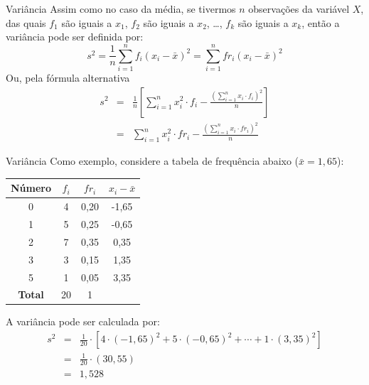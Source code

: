 \documentclass[10pt]{beamer}\usepackage[]{graphicx}\usepackage[]{color}
\theoremstyle{definition}
\begin{document}
\begin{frame}{Variância}
  Assim como no caso da média, se tivermos $n$ observações da variável
  $X$, das quais $f_1$ são iguais a $x_1$, $f_2$ são iguais a $x_2$,
  \ldots, $f_k$ são iguais a $x_k$, então a variância pode ser definida
  por:
  \begin{equation*}
    s^2 = \frac{1}{n} \sum_{i=1}^{n} f_i (x_i - \bar{x})^2 =
    \sum_{i=1}^{n} fr_i (x_i - \bar{x})^2
  \end{equation*}
  Ou, pela fórmula alternativa
  \begin{eqnarray*}
    s^2 &=& \frac{1}{n} \left[ \sum_{i=1}^{n} x_{i}^{2} \cdot f_i -
    \frac{(\sum_{i=1}^{n} x_i \cdot f_i)^2}{n} \right] \\
        &=& \sum_{i=1}^{n} x_{i}^{2} \cdot fr_i -
    \frac{(\sum_{i=1}^{n} x_i \cdot fr_i)^2}{n}
  \end{eqnarray*}
\end{frame}

\begin{frame}{Variância}
  Como exemplo, considere a tabela de frequência abaixo ($\bar{x} =
  1,65$):
  \begin{table}[h]
    \centering
    \begin{tabular}{cccc}
      \hline
      \textbf{Número} & \textbf{$f_i$} & \textbf{$fr_i$} & \textbf{$x_i - \bar{x}$} \\
      \hline
      0 & 4 & 0,20 & -1,65 \\
      1 & 5 & 0,25 & -0,65 \\
      2 & 7 & 0,35 & 0,35 \\
      3 & 3 & 0,15 & 1,35 \\
      5 & 1 & 0,05 & 3,35 \\
      \hline
      \textbf{Total} & 20 & 1 & \\
      \hline
    \end{tabular}
  \end{table}
  A variância pode ser calculada por:
  \begin{eqnarray*}
    s^2 &=& \frac{1}{20} \cdot [4 \cdot (-1,65)^2 + 5 \cdot (-0,65)^2 + \cdots + 1 \cdot (3,35)^2]\\
            &=& \frac{1}{20} \cdot (30,55)\\
            &=& 1,528
  \end{eqnarray*}
\end{frame}
\end{document}
